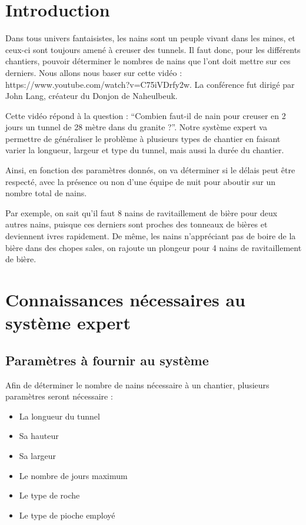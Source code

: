 \documentclass[a4paper,10pt]{report}
\begin{document}
\chapter*{Introduction}

Dans tous univers fantaisistes, les nains sont un peuple vivant dans les mines, et ceux-ci sont toujours amené à creuser des tunnels. Il faut donc, pour les différents chantiers, pouvoir déterminer le nombres de nains que l’ont doit mettre sur ces derniers. Nous allons nous baser sur cette vidéo : https://www.youtube.com/watch?v=C75iVDrfy2w. 
La conférence fut dirigé par John Lang, créateur du Donjon de Naheulbeuk.

Cette vidéo répond à la question : “Combien faut-il de nain pour creuser en 2 jours un tunnel de 28 mètre dans du granite ?”. Notre système expert va permettre de généraliser le problème à plusieurs types de chantier en faisant varier la longueur, largeur et type du tunnel, mais aussi la durée du chantier. 

Ainsi, en fonction des paramètres donnés, on va déterminer si le délais peut être respecté, avec la présence ou non d’une équipe de nuit pour aboutir sur un nombre total de nains. 

Par exemple, on sait qu’il faut 8 nains de ravitaillement de bière pour deux autres nains, puisque ces derniers sont proches des tonneaux de bières et deviennent ivres rapidement. De même, les nains n’appréciant pas de boire de la bière dans des chopes sales, on rajoute un plongeur pour 4 nains de ravitaillement de bière. 


\chapter{Connaissances nécessaires au système expert}
 \section{Paramètres à fournir au système}
 Afin de déterminer le nombre de nains nécessaire à un chantier, plusieurs paramètres seront nécessaire :
\begin{itemize}
\item La longueur du tunnel
\item Sa hauteur
\item Sa largeur
\item Le nombre de jours maximum
\item Le type de roche
\item Le type de pioche employé
\end{itemize}
\end{document}
